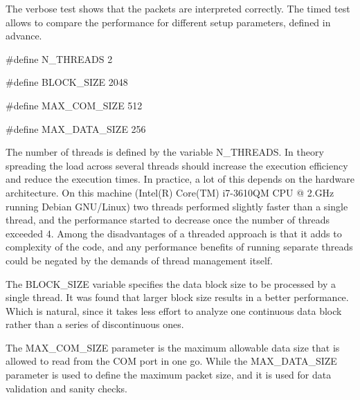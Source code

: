 The verbose test shows that the packets are interpreted correctly. The timed test allows to compare the performance for different setup parameters, defined in advance.


\begin{DoxyCodeInclude}

\textcolor{preprocessor}{#define N\_THREADS 2}

\textcolor{preprocessor}{#define BLOCK\_SIZE 2048}

\textcolor{preprocessor}{#define MAX\_COM\_SIZE 512}

\textcolor{preprocessor}{#define MAX\_DATA\_SIZE 256}
\end{DoxyCodeInclude}
 The number of threads is defined by the variable N\+\_\+\+T\+H\+R\+E\+A\+DS. In theory spreading the load across several threads should increase the execution efficiency and reduce the execution times. In practice, a lot of this depends on the hardware architecture. On this machine (Intel(\+R) Core(\+T\+M) i7-\/3610\+QM C\+PU @ 2.\+G\+Hz running Debian G\+N\+U/\+Linux) two threads performed slightly faster than a single thread, and the performance started to decrease once the number of threads exceeded 4. Among the disadvantages of a threaded approach is that it adds to complexity of the code, and any performance benefits of running separate threads could be negated by the demands of thread management itself.

The B\+L\+O\+C\+K\+\_\+\+S\+I\+ZE variable specifies the data block size to be processed by a single thread. It was found that larger block size results in a better performance. Which is natural, since it takes less effort to analyze one continuous data block rather than a series of discontinuous ones.

The M\+A\+X\+\_\+\+C\+O\+M\+\_\+\+S\+I\+ZE parameter is the maximum allowable data size that is allowed to read from the C\+OM port in one go. While the M\+A\+X\+\_\+\+D\+A\+T\+A\+\_\+\+S\+I\+ZE parameter is used to define the maximum packet size, and it is used for data validation and sanity checks. 